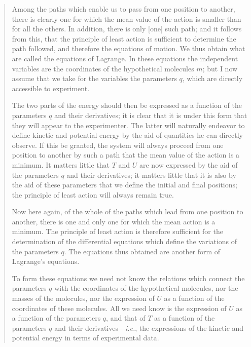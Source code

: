 \documentclass{article}
\begin{document}
\begin{quote}
    Among the paths which enable us to pass from one position to another, there is clearly one for which the mean value of the action is smaller than for all the others.  In addition, there is only [one] such path; and it follows from this, that the principle of least action is sufficient to determine the path followed, and therefore the equations of motion.  We thus obtain what are called the equations of Lagrange.  In these equations the independent variables are the coordinates of the hypothetical molecules $m$; but I now assume that we take for the variables the parameters $q$, which are directly accessible to experiment.
    
    The two parts of the energy should then be expressed as a function of the parameters $q$ and their derivatives; it is clear that it is under this form that they will appear to the experimenter.  The latter will naturally endeavor to define kinetic and potential energy by the aid of quantities he can directly observe.  If this be granted, the system will always proceed from one position to another by such a path that the mean value of the action is a minimum.  It matters little that $T$ and $U$ are now expressed by the aid of the parameters $q$ and their derivatives; it matters little that it is also by the aid of these parameters that we define the initial and final positions; the principle of least action will always remain true.
    
    Now here again, of the whole of the paths which lead from one position to another, there is one and only one for which the mean action is a minimum.  The principle of least action is therefore sufficient for the determination of the differential equations which define the variations of the parameters $q$.  The equations thus obtained are another form of Lagrange's equations.
    
    To form these equations we need not know the relations which connect the parameters $q$ with the coordinates of the hypothetical molecules, nor the masses of the molecules, nor the expression of $U$ as a function of the coordinates of these molecules.  All we need know is the expression of $U$ as a function of the parameters $q$, and that of $T$ as a function of the parameters $q$ and their derivatives---\emph{i.e.}, the expressions of the kinetic and potential energy in terms of experimental data.
    

\end{quote}
\end{document}
